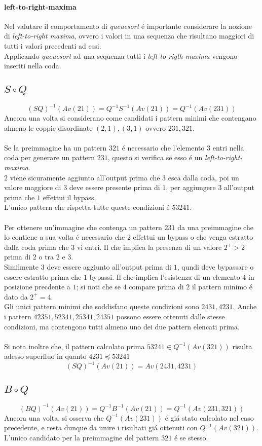 \paragraph*{left-to-right-maxima}Nel valutare il comportamento di \textit{queuesort} \'e importante considerare la nozione di \textit{left-to-right maxima}, ovvero i valori in una sequenza che risultano maggiori di tutti i valori precedenti ad essi.\\Applicando \textit{queuesort} ad una sequenza tutti i \textit{left-to-rigth-maxima} vengono inseriti nella coda.
\subsection*{$S\circ{Q}$}$$(SQ)^{-1}(Av(21))=Q^{-1}S^{-1}(Av(21))=Q^{-1}(Av(231))$$Ancora una volta si considerano come candidati i pattern minimi che contengano almeno le coppie disordinate $(2,1),(3,1)$ ovvero $231,321$.\\\\
Se la preimmagine ha un pattern $321$ \'e necessario che l'elemento $3$ entri nella coda per generare un pattern $231$, questo si verifica se esso \'e un \textit{left-to-right-maxima}.\\$2$ viene sicuramente aggiunto all'output prima che $3$ esca dalla coda, poi un valore maggiore di $3$ deve essere presente prima di $1$, per aggiungere $3$ all'output prima che $1$ effettui il bypass.\\
L'unico pattern che rispetta tutte queste condizioni \'e $\overline{5}3241$.\\\\
Per ottenere un'immagine che contenga un pattern $231$ da una preimmagine che lo contiene a sua volta \'e necessario che $2$ effettui un bypass o che venga estratto dalla coda prima che $3$ vi entri. Il che implica la presenza di un valore $2^+>2$ prima di $2$ o tra $2$ e $3$.\\Similmente $3$ deve essere aggiunto all'output prima di $1$, qundi deve bypassare o essere estratto prima che $1$ bypassi. Il che implica l'esistenza di un elemento $4$ in posizione precdente a $1$; si noti che se $4$ compare prima di $2$ il pattern minimo \'e dato da $2^+=4$.\\
Gli unici pattern minimi che soddisfano queste condizioni sono $2431,4231$. Anche i pattern $42351,52341,25341,24351$ possono essere ottenuti dalle stesse condizioni, ma contengono tutti almeno uno dei due pattern elencati prima.
\\\\Si nota inoltre che, il pattern calcolato prima $\overline{5}3241\in Q^{-1}(Av(321))$ risulta adesso superfluo in quanto $4231\preceq\overline{5}3241$
$$(SQ)^{-1}(Av(21))=Av(2431,4231)$$
\subsection*{$B\circ{Q}$}$$(BQ)^{-1}(Av(21))=Q^{-1}B^{-1}(Av(21))=Q^{-1}(Av(231,321))$$
Ancora una volta, si osserva che $Q^{-1}(Av(231))$ \'e gi\'a stato calcolato nel caso precedente, e resta dunque da unire i risultati gi\'a ottenuti con $Q^{-1}(Av(321))$.\\
L'unico candidato per la preimmagine del pattern $321$ \'e se stesso.